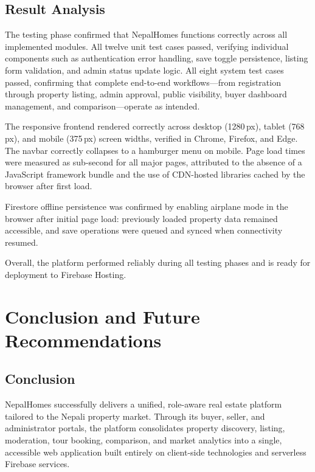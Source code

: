 \documentclass[12pt,a4paper]{report}
\begin{document}
\section{Result Analysis}

The testing phase confirmed that NepalHomes functions correctly across all
implemented modules. All twelve unit test cases passed, verifying individual
components such as authentication error handling, save toggle persistence,
listing form validation, and admin status update logic. All eight system test
cases passed, confirming that complete end-to-end workflows---from registration
through property listing, admin approval, public visibility, buyer dashboard
management, and comparison---operate as intended.

The responsive frontend rendered correctly across desktop (1280\,px), tablet
(768\,px), and mobile (375\,px) screen widths, verified in Chrome, Firefox,
and Edge. The navbar correctly collapses to a hamburger menu on mobile. Page
load times were measured as sub-second for all major pages, attributed to the
absence of a JavaScript framework bundle and the use of CDN-hosted libraries
cached by the browser after first load.

Firestore offline persistence was confirmed by enabling airplane mode in the
browser after initial page load: previously loaded property data remained
accessible, and save operations were queued and synced when connectivity resumed.

Overall, the platform performed reliably during all testing phases and is ready
for deployment to Firebase Hosting.

\chapter{Conclusion and Future Recommendations}

\section{Conclusion}

NepalHomes successfully delivers a unified, role-aware real estate platform
tailored to the Nepali property market. Through its buyer, seller, and
administrator portals, the platform consolidates property discovery, listing,
moderation, tour booking, comparison, and market analytics into a single,
accessible web application built entirely on client-side technologies and
serverless Firebase services.
\end{document}
